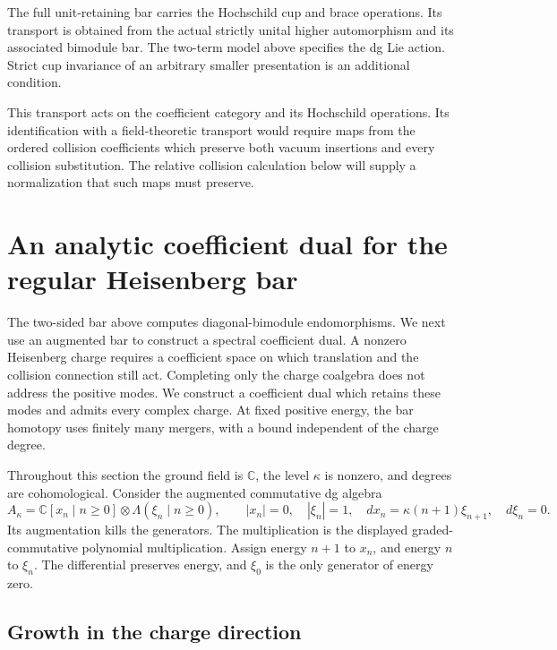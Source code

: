 The full unit-retaining bar carries the Hochschild cup and
brace operations.  Its transport is obtained from the actual
strictly unital higher automorphism and its associated bimodule
bar.  The two-term model above specifies the dg Lie action.
Strict cup invariance of an arbitrary smaller presentation is
an additional condition.


This transport acts on the coefficient category and its Hochschild
operations.  Its identification with a field-theoretic transport would
require maps from the ordered collision coefficients which preserve
both vacuum insertions and every collision substitution.  The relative
collision calculation below will supply a normalization that such maps
must preserve.

\section{An analytic coefficient dual for the regular Heisenberg bar}
\label{cbc:rc:an:sec:analytic-dual}

The two-sided bar above computes diagonal-bimodule endomorphisms.
We next use an augmented bar to construct a spectral coefficient dual.
A nonzero Heisenberg charge requires a coefficient space on which
translation and the collision connection still act. Completing only
the charge coalgebra does not address the positive modes. We construct
a coefficient dual which retains these modes and admits every complex
charge. At fixed positive energy, the bar homotopy uses finitely many mergers,
with a bound independent of the charge degree.

Throughout this section the ground field is \(\mathbb C\), the level
\(\kappa\) is nonzero, and degrees are cohomological. Consider the
augmented commutative dg algebra
\begin{equation}\label{cbc:rc:an:eq:point}
 A_\kappa=\mathbb C[x_n\mid n\geq0]\otimes
             \Lambda(\xi_n\mid n\geq0),\qquad
 |x_n|=0,\quad |\xi_n|=1,\quad
 dx_n=\kappa(n+1)\xi_{n+1},\quad d\xi_n=0.
\end{equation}
Its augmentation kills the generators. The multiplication is the
displayed graded-commutative polynomial multiplication.
Assign energy \(n+1\) to
\(x_n\), and energy \(n\) to \(\xi_n\). The differential preserves
energy, and \(\xi_0\) is the only generator of energy zero.

\subsection{Growth in the charge direction}

